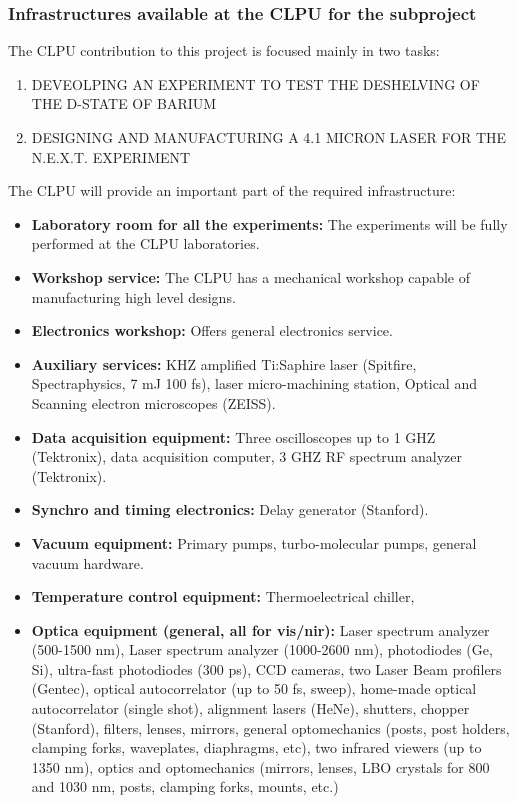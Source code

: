 
\subsubsection*{Infrastructures available at the CLPU for the subproject}


The CLPU contribution to this project is focused mainly in two tasks: 
\begin{enumerate}
\item{DEVEOLPING AN EXPERIMENT TO TEST THE DESHELVING OF THE D-STATE OF BARIUM}
\item{DESIGNING AND MANUFACTURING A 4.1 MICRON LASER FOR THE N.E.X.T. EXPERIMENT}
\end{enumerate}

The CLPU will provide an important part of the required infrastructure:
 
 \begin{itemize}
    \item \textbf{Laboratory room for all the experiments:} The experiments will be fully performed at the CLPU laboratories.
    
\item \textbf{Workshop service:} The CLPU has a mechanical workshop capable of manufacturing high level designs. 

\item \textbf{Electronics workshop:} Offers general electronics service. 

\item \textbf{Auxiliary services:} KHZ amplified Ti:Saphire laser (Spitfire, Spectraphysics, 7 mJ 100 fs), laser micro-machining station, Optical and Scanning electron microscopes (ZEISS).  

\item \textbf{Data acquisition equipment:} Three oscilloscopes up to 1 GHZ (Tektronix), data acquisition computer, 3 GHZ RF spectrum analyzer (Tektronix). 

\item \textbf{Synchro and timing electronics:} Delay generator (Stanford). 

\item \textbf{Vacuum equipment:} Primary pumps, turbo-molecular pumps, general vacuum hardware.

\item \textbf{Temperature control equipment:} Thermoelectrical chiller, 

\item \textbf{Optica equipment (general, all for vis/nir):} Laser spectrum analyzer (500-1500 nm), Laser spectrum analyzer (1000-2600 nm), photodiodes (Ge, Si), ultra-fast photodiodes (300 ps), CCD cameras, two Laser Beam profilers (Gentec), optical autocorrelator (up to 50 fs, sweep), home-made optical autocorrelator (single shot), alignment lasers (HeNe), shutters, chopper (Stanford), filters, lenses, mirrors, general optomechanics (posts, post holders, clamping forks, waveplates, diaphragms, etc), two infrared viewers (up to 1350 nm), optics and optomechanics (mirrors, lenses, LBO crystals for 800 and 1030 nm, posts, clamping forks, mounts, etc.)


\end{itemize}
